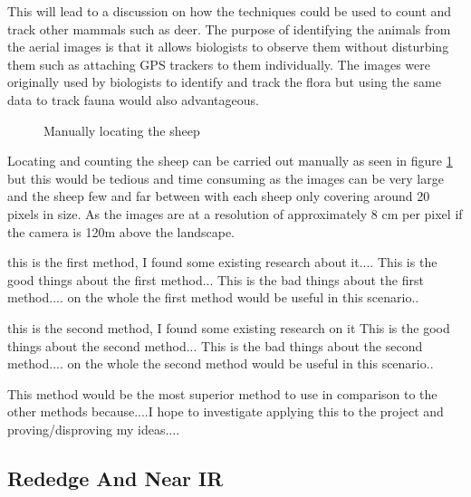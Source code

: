This will lead to a discussion on how the techniques could be used to count and track other mammals such as deer. The purpose of identifying the animals from the aerial images is that it allows biologists to observe them without disturbing them such as attaching GPS trackers to them individually. The images were originally used by biologists to identify and track the flora but using the same data to track fauna would also advantageous.

\begin{figure}[H]
    \centering
    \caption{Manually locating the sheep}
    \label{fig:manual}
\end{figure}

Locating and counting the sheep can be carried out manually as seen in figure \ref{fig:manual} but this would be tedious and time consuming as the images can be very large and the sheep few and far between with each sheep only covering around 20 pixels in size. As the images are at a resolution of approximately 8 cm per pixel if the camera is  120m above the landscape.\cite{rededge}

this is the first method, I found some existing research about it....
This is the good things about the first method...
This is the bad things about the first method....
on the whole the first method would be useful in this scenario..

this is the second method, I found some existing research on it
This is the good things about the second method...
This is the bad things about the second method....
on the whole the second method would be useful in this scenario..

This method would be the most superior method to use in comparison to the other methods because....I hope to investigate applying this to the project and proving/disproving my ideas....

\subsection{Rededge And Near IR}

